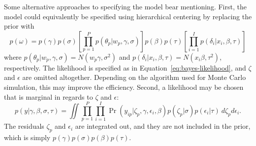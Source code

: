 \documentclass[12pt, letterpaper]{article}
\begin{document}
Some alternative approaches to specifying the model bear mentioning. First, the model could equivalently be specified using hierarchical centering \parencite{gelfand1995efficient} by replacing the prior with
\begin{equation}
	p(\omega) =
	p(\gamma) p(\sigma)
	\left [ 
		\prod_{p=1}^P p(\theta_p | w_p, \gamma, \sigma)
	\right ]
	p(\beta) 	p(\tau)
	\left [ 
		\prod_{i=1}^I p(\delta_i | x_i, \beta, \tau) 
	\right ]
\end{equation}
where 
$p(\theta_p | w_p, \gamma, \sigma) = N(w_p \gamma, \sigma^2)$ and
$p(\delta_i | x_i, \beta, \tau)    = N(x_i \beta, \tau^2)$, 
respectively. The likelihood is specified as in Equation~\ref{eq:bayes-likelihood}, and $\zeta$ and $\epsilon$ are omitted altogether. Depending on the algorithm used for Monte Carlo simulation, this may improve the efficiency.
Second, a likelihood may be chosen that is marginal in regards to $\zeta$ and $\epsilon$:
\begin{equation} \label{eq:marginal-likelihood}
	p(y | \gamma, \beta, \sigma, \tau) =
	\iint
		\prod_{p=1}^P \prod_{i=1}^I 
		\Pr(y_{ip} | \zeta_p, \gamma, \epsilon_i, \beta)
		p(\zeta_p | \sigma)
		p(\epsilon_i | \tau)
	~d \zeta_p d \epsilon_i
.\end{equation}
The residuals $\zeta_p$ and $\epsilon_i$ are integrated out, and they are not included in the prior, which is simply $p(\gamma) p(\sigma) p(\beta) p(\tau)$.

\end{document}
